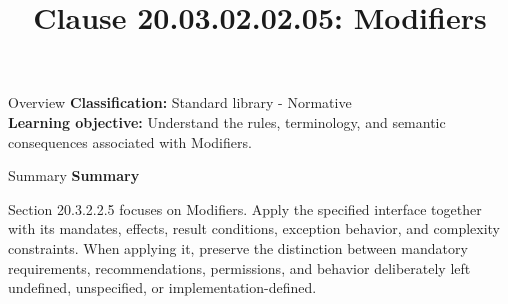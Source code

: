 \documentclass[10pt,letterpaper]{article}
\title{Clause 20.03.02.02.05: Modifiers}
\author{}
\date{}
\begin{document}
\maketitle
\begin{CornellOverviewBox}{Overview}
\textbf{Classification:} Standard library - Normative\\[2pt]
\textbf{Learning objective:} Understand the rules, terminology, and semantic consequences associated with Modifiers.
\end{CornellOverviewBox}\begin{CornellSummaryBox}{Summary}
{\sffamily\bfseries\color{Accent} Summary}\par\vspace{3pt}Section 20.3.2.2.5 focuses on Modifiers. Apply the specified interface together with its mandates, effects, result conditions, exception behavior, and complexity constraints. When applying it, preserve the distinction between mandatory requirements, recommendations, permissions, and behavior deliberately left undefined, unspecified, or implementation-defined.
\end{CornellSummaryBox}
\end{document}
